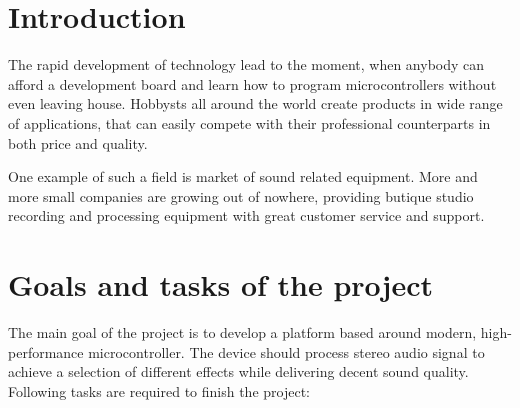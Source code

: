 \documentclass[a4paper,twoside,12pt]{book}
\begin{document}
\chapter{Introduction}
The rapid development of technology lead to the moment, when anybody can afford a development board 
and learn how to program microcontrollers without even leaving house.
Hobbysts all around the world create products in wide range of applications, that can easily compete
with their professional counterparts in both price and quality.

One example of such a field is market of sound related equipment.
More and more small companies are growing out of nowhere,
providing butique studio recording and processing equipment with great customer service and support.




\chapter{Goals and tasks of the project}
The main goal of the project is to develop a platform based around modern,
high-performance microcontroller.
The device should process stereo audio signal to achieve a selection of different effects
while delivering decent sound quality.
Following tasks are required to finish the project:
\end{document}

